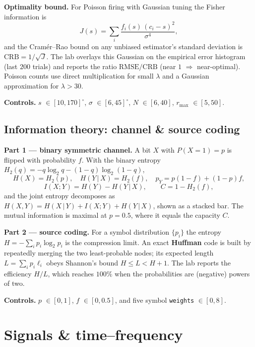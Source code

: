 \documentclass[11pt]{article}
\newcommand{\param}[1]{\textcolor{neonmag}{\texttt{#1}}}
\begin{document}
\textbf{Optimality bound.} For Poisson firing with Gaussian tuning the Fisher information is
\[
J(s) = \sum_{i} \frac{f_i(s)\,(c_i-s)^2}{\sigma^4},
\]
and the Cram\'er--Rao bound on any unbiased estimator's standard deviation is
$\mathrm{CRB} = 1/\sqrt{J}$. The lab overlays this Gaussian on the empirical error histogram
(last $200$ trials) and reports the ratio $\mathrm{RMSE}/\mathrm{CRB}$ (near $1$ $\Rightarrow$
near-optimal). Poisson counts use direct multiplication for small $\lambda$ and a Gaussian
approximation for $\lambda>30$.

\textbf{Controls.} \param{$s$} $\in[10,170]^\circ$, \param{$\sigma$} $\in[6,45]^\circ$,
\param{$N$} $\in[6,40]$, \param{$r_{\max}$} $\in[5,50]$.

\subsection{Information theory: channel \& source coding}

\textbf{Part 1 --- binary symmetric channel.} A bit $X$ with $P(X{=}1)=p$ is flipped with
probability $f$. With the binary entropy $H_2(q) = -q\log_2 q - (1-q)\log_2(1-q)$,
\[
H(X)=H_2(p),\quad H(Y\,|\,X)=H_2(f),\quad p_Y = p(1-f)+(1-p)f,
\]
\[
I(X;Y) = H(Y) - H(Y\,|\,X), \qquad C = 1 - H_2(f),
\]
and the joint entropy decomposes as $H(X,Y) = H(X\,|\,Y) + I(X;Y) + H(Y\,|\,X)$, shown as a
stacked bar. The mutual information is maximal at $p=0.5$, where it equals the capacity $C$.

\textbf{Part 2 --- source coding.} For a symbol distribution $\{p_i\}$ the entropy
$H = -\sum_i p_i \log_2 p_i$ is the compression limit. An exact \textbf{Huffman} code is built
by repeatedly merging the two least-probable nodes; its expected length $L=\sum_i p_i \ell_i$
obeys Shannon's bound $H \le L < H+1$. The lab reports the efficiency $H/L$, which reaches
$100\%$ when the probabilities are (negative) powers of two.

\textbf{Controls.} \param{$p$} $\in[0,1]$, \param{$f$} $\in[0,0.5]$, and five symbol
\param{weights} $\in[0,8]$.

\section{Signals \& time--frequency}

\end{document}
